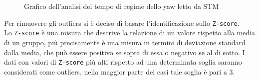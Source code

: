 \begin{figure}[h!]
\centering



	
\caption{Grafico dell'analisi del tempo di regime dello yaw letto da STM}
\label{fig:grafico_analisi_yaw}

\end{figure}


Per rimuovere gli outliers si è deciso di basare l'identificazione sullo \texttt{Z-score}. \\
Lo \texttt{Z-score} è una misura che descrive la relazione di un valore rispetto alla media di un gruppo, più precisamente è una misura in termini di deviazione standard dalla media, che può essere positivo se sopra di essa o negativo se al di sotto. 
I dati con valori di \texttt{Z-score} più alti rispetto ad una determinata soglia saranno considerati come outliers, nella maggior parte dei casi tale soglia è pari a 3.

